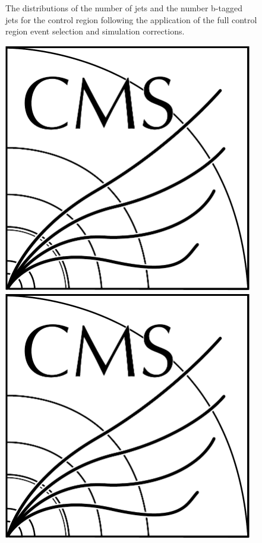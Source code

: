 \begin{figure}[htb]
\caption{
The distributions of the number of jets and the number b-tagged jets for the \ttbar control region following the application of the full control region event selection and simulation corrections.
}
\label{fig:ttbarCR_nJets}
\end{figure}

\begin{figure}[htb]
\centering
\includegraphics[width=0.97\textwidth]{CMS-bw-logo.pdf}
\\
\includegraphics[width=0.97\textwidth]{CMS-bw-logo.pdf}

\end{figure}

